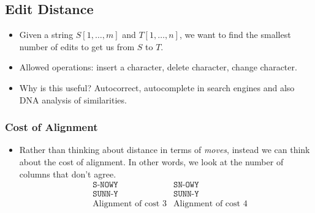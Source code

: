 	\subsection{Edit Distance}
	\begin{itemize}
		\item Given a string $S[1, \dots, m]$ and $T[1, \dots, n]$, we want to find the smallest number of 
			edits to get us from $S$ to $T$. 
		\item Allowed operations: insert a character, delete character, change character.
		\item Why is this useful? Autocorrect, autocomplete in search engines and also DNA analysis of 
			similarities.
	\end{itemize}
	\subsubsection{Cost of Alignment} 
	\begin{itemize}
		\item Rather than thinking about distance in terms of \textit{moves}, instead we can think about 
			the cost of alignment. In other words, we look at the number of columns that don't agree.
			\begin{align*}
				&\texttt{S-NOWY} & \texttt{SN-OWY}\\
				&	\texttt{SUNN-Y} & \texttt{SUNN-Y}\\
				&\text{Alignment of cost 3} & \text{Alignment of cost 4}
			\end{align*}
	\end{itemize}
